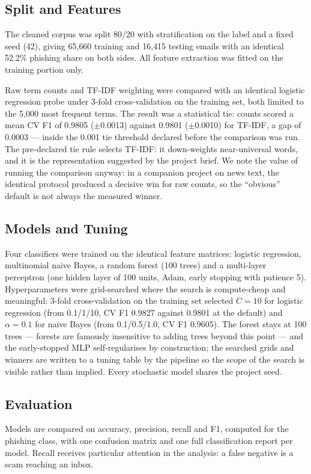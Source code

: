 \documentclass[conference]{IEEEtran}
\begin{document}
\subsection{Split and Features}
The cleaned corpus was split 80/20 with stratification on the label and
a fixed seed (42), giving 65{,}660 training and 16{,}415 testing emails
with an identical 52.2\% phishing share on both sides. All feature
extraction was fitted on the training portion only.

Raw term counts and TF-IDF weighting were compared with an identical
logistic regression probe under 3-fold cross-validation on the training
set, both limited to the 5{,}000 most frequent terms. The result was a
statistical tie: counts scored a mean CV F1 of 0.9805 ($\pm$0.0013)
against 0.9801 ($\pm$0.0010) for TF-IDF, a gap of 0.0003 --- inside the
0.001 tie threshold declared before the comparison was run. The
pre-declared tie rule selects TF-IDF: it down-weights near-universal
words, and it is the representation suggested by the project brief. We
note the value of running the comparison anyway: in a companion project
on news text, the identical protocol produced a decisive win for raw
counts, so the ``obvious'' default is not always the measured winner.

\subsection{Models and Tuning}
Four classifiers were trained on the identical feature matrices:
logistic regression, multinomial naive Bayes, a random forest (100
trees) and a multi-layer perceptron (one hidden layer of 100 units,
Adam, early stopping with patience 5). Hyperparameters were grid-searched
where the search is compute-cheap and meaningful: 3-fold cross-validation
on the training set selected $C=10$ for logistic regression (from
0.1/1/10, CV F1 0.9827 against 0.9801 at the default) and
$\alpha=0.1$ for naive Bayes (from 0.1/0.5/1.0, CV F1 0.9605). The
forest stays at 100 trees --- forests are famously insensitive to adding
trees beyond this point --- and the early-stopped MLP self-regularises
by construction; the searched grids and winners are written to a tuning
table by the pipeline so the scope of the search is visible rather than
implied. Every stochastic model shares the project seed.

\subsection{Evaluation}
Models are compared on accuracy, precision, recall and F1, computed for
the phishing class, with one confusion matrix and one full
classification report per model. Recall receives particular attention in
the analysis: a false negative is a scam reaching an inbox.
\end{document}
